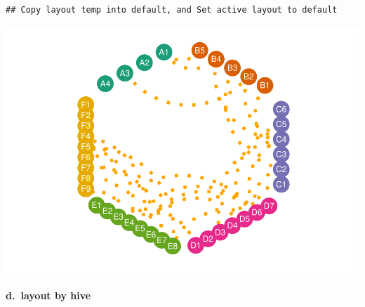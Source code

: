 \documentclass[
]{article}
\let\oldparagraph\paragraph
\renewcommand{\paragraph}[1]{\oldparagraph{#1}\mbox{}}
\begin{document}
\begin{verbatim}
## Copy layout temp into default, and Set active layout to default
\end{verbatim}

\includegraphics{ReadMe1_files/figure-latex/unnamed-chunk-13-1.pdf}

\hypertarget{d.-layout-by-hive}{%
\paragraph{d.~layout by hive}\label{d.-layout-by-hive}}
\end{document}
